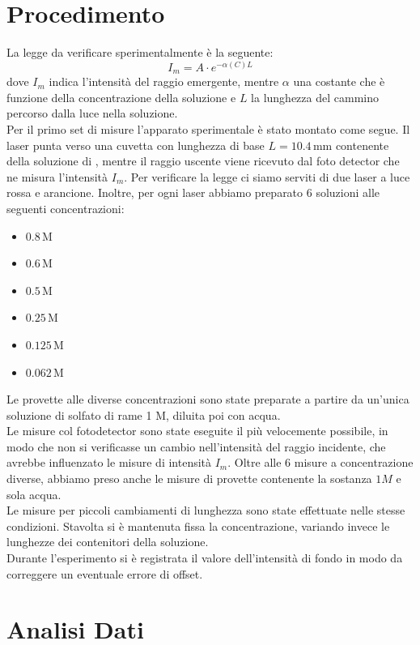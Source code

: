 \documentclass[letterpaper,11pt]{article}
\begin{document}
\begin{body}
\section{Procedimento}
La legge da verificare sperimentalmente è la seguente: 
\begin{equation}
I_m = A \cdot e^{-\alpha (C) L}
\end{equation}
dove $I_m$ indica l'intensità del raggio emergente, mentre $\alpha$ una costante che è funzione della concentrazione della soluzione e $L$ la lunghezza del cammino percorso dalla luce nella soluzione. \\
Per il primo set di misure l'apparato sperimentale è stato montato come segue. Il laser punta verso una cuvetta con lunghezza di base $L = 10.4 \,\text{mm}$ contenente della soluzione di , mentre il raggio uscente viene ricevuto dal foto detector che ne misura l'intensità $I_m$. Per verificare la legge ci siamo serviti di due laser a luce rossa e arancione. Inoltre, per ogni laser abbiamo preparato $6$ soluzioni alle seguenti concentrazioni: 
\begin{itemize}
\item $0.8 \,\text{M}$
\item $0.6 \,\text{M}$
\item $0.5 \,\text{M}$
\item $0.25 \,\text{M}$
\item $0.125 \,\text{M}$
\item $0.062 \,\text{M} $ 
\end{itemize}
Le provette alle diverse concentrazioni sono state preparate a partire da un'unica soluzione di solfato di rame 1 M, diluita poi con acqua. \\
Le misure col fotodetector sono state eseguite il più velocemente possibile, in modo che non si verificasse un cambio nell'intensità del raggio incidente, che avrebbe influenzato le misure di intensità $I_m$. Oltre alle 6 misure a concentrazione diverse, abbiamo preso anche le misure di provette contenente la sostanza $1M$ e sola acqua.\\
Le misure per piccoli cambiamenti di lunghezza sono state effettuate nelle stesse condizioni. Stavolta si è mantenuta fissa la concentrazione, variando invece le lunghezze dei contenitori della soluzione.\\
Durante l'esperimento si è registrata il valore dell'intensità di fondo in modo da correggere un eventuale errore di offset.

\section{Analisi Dati}


\end{body}
\end{document}
